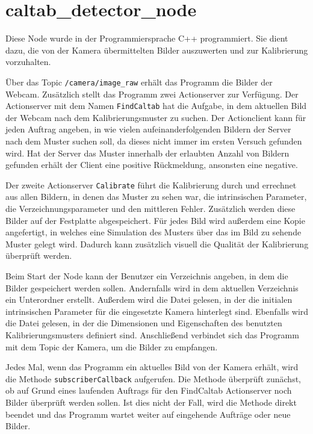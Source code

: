 \section{caltab\_detector\_node} %
\label{sec:caltab_detector_node_impl}
Diese Node wurde in der Programmiersprache C++ programmiert. Sie dient dazu, die von der Kamera übermittelten Bilder auszuwerten und zur Kalibrierung vorzuhalten.

Über das Topic \texttt{/camera/image\_raw} erhält das Programm die Bilder der Webcam. Zusätzlich stellt das Programm zwei Actionserver zur Verfügung. Der Actionserver mit dem Namen \texttt{FindCaltab} hat die Aufgabe, in dem aktuellen Bild der Webcam nach dem Kalibrierungsmuster zu suchen. Der Actionclient kann für jeden Auftrag angeben, in wie vielen aufeinanderfolgenden Bildern der Server nach dem Muster suchen soll, da dieses nicht immer im ersten Versuch gefunden wird. Hat der Server das Muster innerhalb der erlaubten Anzahl von Bildern gefunden erhält der Client eine positive Rückmeldung, ansonsten eine negative.

Der zweite Actionserver \texttt{Calibrate} führt die Kalibrierung durch und errechnet aus allen Bildern, in denen das Muster zu sehen war, die intrinsischen Parameter, die Verzeichnungsparameter und den mittleren Fehler. Zusätzlich werden diese Bilder auf der Festplatte abgespeichert. Für jedes Bild wird außerdem eine Kopie angefertigt, in welches eine Simulation des Musters über das im Bild zu sehende Muster gelegt wird. Dadurch kann zusätzlich visuell die Qualität der Kalibrierung überprüft werden.

Beim Start der Node kann der Benutzer ein Verzeichnis angeben, in dem die Bilder gespeichert werden sollen. Andernfalls wird in dem aktuellen Verzeichnis ein Unterordner erstellt. Außerdem wird die Datei gelesen, in der die initialen intrinsischen Parameter für die eingesetzte Kamera hinterlegt sind. Ebenfalls wird die Datei gelesen, in der die Dimensionen und Eigenschaften des benutzten Kalibrierungsmusters definiert sind.  Anschließend verbindet sich das Programm mit dem Topic der Kamera, um die Bilder zu empfangen.

Jedes Mal, wenn das Programm ein aktuelles Bild von der Kamera erhält, wird die Methode \texttt{subscriberCallback} aufgerufen. Die Methode überprüft zunächst, ob auf Grund eines laufenden Auftrags für den FindCaltab Actionserver noch Bilder überprüft werden sollen. Ist dies nicht der Fall, wird die Methode direkt beendet und das Programm wartet weiter auf eingehende Aufträge oder neue Bilder. 

